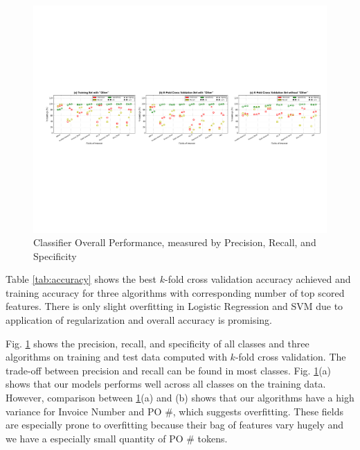 \begin{figure}[ht]
\centering
\includegraphics[width=1\linewidth, trim={1cm 8cm 0.3cm 8cm}, clip, ]{model_all.pdf}
\caption{Classifier Overall Performance, measured by Precision, Recall, and Specificity}
\label{fig:model}
\end{figure}

Table \ref{tab:accuracy} shows the best $k$-fold cross validation accuracy achieved and training accuracy for three algorithms with corresponding number of top scored features.  There is only slight overfitting in Logistic Regression and SVM due to application of regularization and overall accuracy is promising.

Fig. \ref{fig:model} shows the precision, recall, and specificity of all classes and three algorithms on training and test data computed with $k$-fold cross validation. The trade-off between precision and recall can be found in most classes. Fig. \ref{fig:model}(a) shows that our models performs well across all classes on the training data. However, comparison between \ref{fig:model}(a) and (b) shows that our algorithms have a high variance for Invoice Number and PO \#, which suggests overfitting. These fields are especially prone to overfitting because their bag of features vary hugely and we have a especially small quantity of PO \# tokens.

